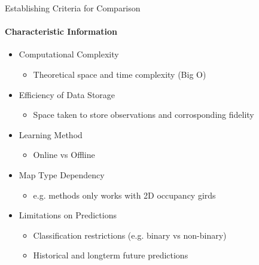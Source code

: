 \documentclass{beamer}
\begin{document}
\begin{frame}[t]{Establishing Criteria for Comparison}
  \framesubtitle{Characteristic Information}
  \begin{itemize}
    \setlength\itemsep{1em}
    \item Computational Complexity
      \begin{itemize}
        \item Theoretical space and time complexity (Big O)
      \end{itemize}

    \item Efficiency of Data Storage
      \begin{itemize}
        \item Space taken to store observations and corrosponding fidelity
      \end{itemize}

    \item Learning Method
      \begin{itemize}
        \item Online vs Offline
      \end{itemize}

    \item Map Type Dependency
      \begin{itemize}
        \item e.g. methods only works with 2D occupancy girds
      \end{itemize}

    \item Limitations on Predictions
      \begin{itemize}
        \item Classification restrictions (e.g. binary vs non-binary)
        \item Historical and longterm future predictions
      \end{itemize}

  \end{itemize}
\end{frame}
\end{document}
